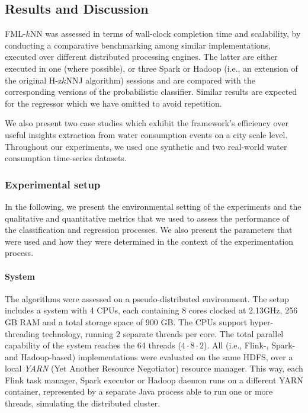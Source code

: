 \subsection{Results and Discussion}
\label{sec:evaluation}
FML-$k$NN was assessed in terms of wall-clock completion time and scalability, by conducting a comparative benchmarking among similar implementations, executed over different distributed processing engines. The latter are either executed in one (where possible), or three Spark or Hadoop (i.e., an extension of the original H-z$k$NNJ algorithm) sessions and are compared with the corresponding versions of the probabilistic classifier. Similar results are expected for the regressor which we have omitted to avoid repetition.

We also present two case studies which exhibit the framework's efficiency over useful insights extraction from water consumption events on a city scale level. Throughout our experiments, we used one synthetic and two real-world water consumption time-series datasets.

\subsubsection{Experimental setup}
\label{subsec:expsetup}
In the following, we present the environmental setting of the experiments and the qualitative and quantitative metrics that we used to assess the performance of the classification and regression processes. We also present the parameters that were used and how they were determined in the context of the experimentation process.

\paragraph{System}
\label{par:system}
The algorithms were assessed on a pseudo-distributed environment. The setup includes a system with 4 CPUs, each containing 8 cores clocked at 2.13GHz, 256 GB RAM and a total storage space of 900 GB. The CPUs support hyper-threading technology, running 2 separate threads per core. The total parallel capability of the system reaches the 64 threads ($4 \cdot 8 \cdot 2$). All (i.e., Flink-, Spark- and Hadoop-based) implementations were evaluated on the same HDFS, over a local \textit{YARN} (Yet Another Resource Negotiator) resource manager. This way, each Flink task manager, Spark executor or Hadoop daemon runs on a different YARN container, represented by a separate Java process able to run one or more threads, simulating the distributed cluster.

